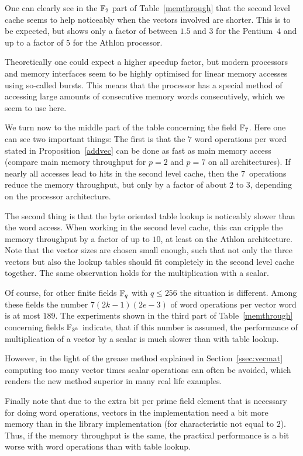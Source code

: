 One can clearly see in the $\mathbb{F}_2$ part of
Table~\ref{memthrough} that the second level cache seems to help noticeably
when the vectors involved are shorter. This is to be expected, but shows
only a factor of between $1.5$ and $3$ for the Pentium~4 and up to 
a factor of $5$ for the Athlon processor.

Theoretically one could expect a higher speedup factor, but modern
processors and memory interfaces seem to be highly optimised for 
linear memory accesses using so-called bursts. This means that the
processor has a special method of accessing large amounts of consecutive
memory words consecutively, which we seem to use here.

We turn now to the middle part of the table concerning the field $\mathbb{F}_7$.
Here one can see two important things: The first is that the $7$ word
operations per word stated in Proposition~\ref{addvec} can be done as
fast as main memory access (compare main memory throughput for $p=2$ and
$p=7$ on all architectures). If nearly all accesses lead to hits in 
the second level cache, then the $7$~operations reduce the memory
throughput, but only by a factor of about $2$ to $3$, depending on
the processor architecture.

The second thing is that the byte oriented table lookup is noticeably
slower than the word access. When working in the second level cache,
this can cripple the memory throughput by a factor of up to $10$, at least on
the Athlon architecture. Note that the vector sizes are chosen small
enough, such that not only the three vectors but also the lookup tables
should fit completely in the second level cache together.
The same observation holds for the multiplication with a scalar. 

Of course, for other finite fields $\mathbb{F}_q$ with $q \le 256$ the situation
is different. Among these fields the number $7(2k-1)(2e-3)$ of word
operations per vector word is at most $189$. The experiments shown in
the third part of Table~\ref{memthrough} concerning fields $\mathbb{F}_{3^k}$ 
indicate, that
if this number is assumed, the performance of multiplication of a vector
by a scalar is much slower than with table lookup. 

However, in the light of the grease method explained in
Section~\ref{ssec:vecmat} computing too many vector times scalar 
operations can often be avoided, which renders the new method
superior in many real life examples.

Finally note that due to the extra bit per prime field element that
is necessary for doing word operations, vectors in the {\cvec}
implementation need a bit more memory than in the {\GAP} library
implementation (for characteristic not equal to $2$).
Thus, if the memory throughput is the same, the practical performance is 
a bit worse with word operations than with table lookup.

